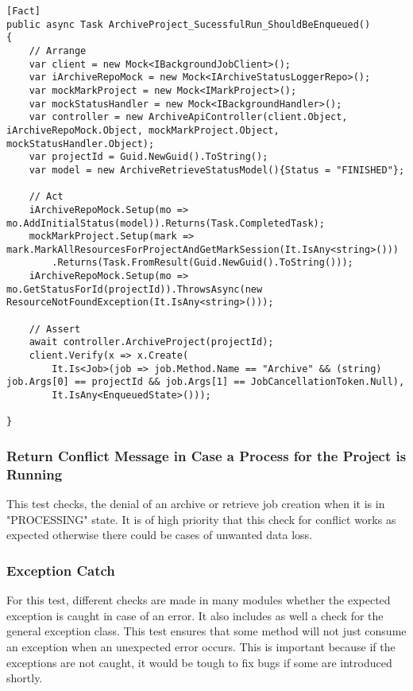 \begin{lstlisting}[language={[Sharp]C}, caption={Hangfire Job creation test}, captionpos=b,label={lst:hangfireCreate}]
[Fact]
public async Task ArchiveProject_SucessfulRun_ShouldBeEnqueued()
{
    // Arrange
    var client = new Mock<IBackgroundJobClient>();
    var iArchiveRepoMock = new Mock<IArchiveStatusLoggerRepo>();
    var mockMarkProject = new Mock<IMarkProject>();
    var mockStatusHandler = new Mock<IBackgroundHandler>();
    var controller = new ArchiveApiController(client.Object, iArchiveRepoMock.Object, mockMarkProject.Object, mockStatusHandler.Object);
    var projectId = Guid.NewGuid().ToString();
    var model = new ArchiveRetrieveStatusModel(){Status = "FINISHED"}; 
    
    // Act
    iArchiveRepoMock.Setup(mo => mo.AddInitialStatus(model)).Returns(Task.CompletedTask);
    mockMarkProject.Setup(mark => mark.MarkAllResourcesForProjectAndGetMarkSession(It.IsAny<string>()))
        .Returns(Task.FromResult(Guid.NewGuid().ToString()));
    iArchiveRepoMock.Setup(mo => mo.GetStatusForId(projectId)).ThrowsAsync(new ResourceNotFoundException(It.IsAny<string>()));

    // Assert
    await controller.ArchiveProject(projectId);
    client.Verify(x => x.Create(
        It.Is<Job>(job => job.Method.Name == "Archive" && (string) job.Args[0] == projectId && job.Args[1] == JobCancellationToken.Null),
        It.IsAny<EnqueuedState>()));

}
\end{lstlisting}

\subsubsection{Return Conflict Message in Case a Process for the Project is Running}
This test checks, the denial of an archive or retrieve job creation when it is in "PROCESSING" state. It is of high priority that this check
for conflict works as expected otherwise there could be cases of unwanted data loss. 

\subsubsection{Exception Catch}
For this test, different checks are made in many modules whether the expected exception is caught in case of an error. It also includes as well a check for the general
exception class. This test ensures that some method will not just consume an exception when an unexpected error occurs. This is important because if 
the exceptions are not caught, it would be tough to fix bugs if some are introduced shortly.


